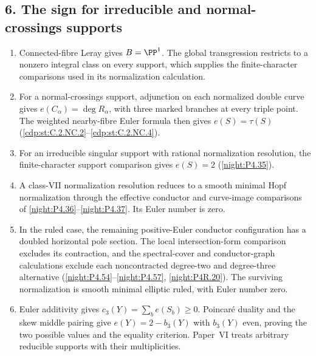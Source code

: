 \subsection*{6. The sign for irreducible and normal-crossings supports}
\RungOne
\begin{enumerate}[label=\arabic*.,leftmargin=*]
\item Connected-fibre Leray gives $B=\PP^1$.  The global
transgression restricts to a nonzero integral class on every
support, which supplies the finite-character comparisons used in
its normalization calculation.
\item For a normal-crossings support, adjunction on each
normalized double curve gives $e(C_\alpha)=\deg R_\alpha$,
with three marked branches at every triple point.  The weighted
nearby-fibre Euler formula then gives $e(S)=\tau(S)$
(\ref{cdp:st:C.2.NC.2}--\ref{cdp:st:C.2.NC.4}).
\item For an irreducible singular support with rational
normalization resolution, the finite-character support comparison
gives $e(S)=2$ (\ref{night:P4.35}).
\item A class-VII normalization resolution reduces to a smooth
minimal Hopf normalization through the effective conductor and
curve-image comparisons of \ref{night:P4.36}--\ref{night:P4.37}.
Its Euler number is zero.
\item In the ruled case, the remaining positive-Euler conductor
configuration has a doubled horizontal pole section.  The local
intersection-form comparison excludes its contraction, and the
spectral-cover and conductor-graph calculations exclude each
noncontracted degree-two and degree-three alternative
(\ref{night:P4.54}--\ref{night:P4.57}, \ref{night:P4R.20}).
The surviving normalization is smooth minimal elliptic ruled,
with Euler number zero.
\item Euler additivity gives $c_3(Y)=\sum_b e(S_b)\ge0$.
Poincar\'e duality and the skew middle pairing give
$e(Y)=2-b_3(Y)$ with $b_3(Y)$ even, proving the two possible
values and the equality criterion.  Paper~VI treats arbitrary
reducible supports with their multiplicities.
\end{enumerate}

